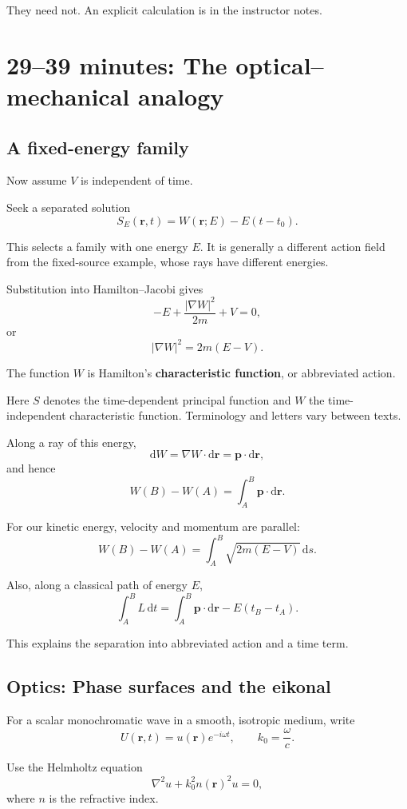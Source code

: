 \documentclass[11pt,a4paper]{article}
\newcommand{\dd}{\mathrm{d}}
\newcommand{\vr}{\mathbf{r}}
\newcommand{\vp}{\mathbf{p}}
\begin{document}
They need not.
An explicit calculation is in the instructor notes.

\section*{29--39 minutes: The optical--mechanical analogy}

\subsection*{A fixed-energy family}

Now assume \(V\) is independent of time.

Seek a separated solution
\[
\boxed{
S_E(\vr,t)
=
W(\vr;E)-E(t-t_0).
}
\]

This selects a family with one energy \(E\).
It is generally a different action field from the fixed-source
example, whose rays have different energies.

Substitution into Hamilton--Jacobi gives
\[
-E+\frac{|\nabla W|^2}{2m}+V=0,
\]
or
\[
\boxed{
|\nabla W|^2=2m(E-V).
}
\]

The function \(W\) is Hamilton's \textbf{characteristic function},
or abbreviated action.

Here \(S\) denotes the time-dependent principal function and
\(W\) the time-independent characteristic function.
Terminology and letters vary between texts.

Along a ray of this energy,
\[
\dd W
=
\nabla W\cdot\dd\vr
=
\vp\cdot\dd\vr,
\]
and hence
\[
W(B)-W(A)
=
\int_A^B\vp\cdot\dd\vr.
\]

For our kinetic energy, velocity and momentum are parallel:
\[
\boxed{
W(B)-W(A)
=
\int_A^B
\sqrt{2m(E-V)}\,\dd s.
}
\]

Also, along a classical path of energy \(E\),
\[
\int_A^B L\,\dd t
=
\int_A^B\vp\cdot\dd\vr
-
E(t_B-t_A).
\]

This explains the separation into abbreviated action
and a time term.

\subsection*{Optics: Phase surfaces and the eikonal}

For a scalar monochromatic wave in a smooth, isotropic
medium, write
\[
U(\vr,t)=u(\vr)e^{-i\omega t},
\qquad
k_0=\frac{\omega}{c}.
\]

Use the Helmholtz equation
\[
\nabla^2u+k_0^2n(\vr)^2u=0,
\]
where \(n\) is the refractive index.
\end{document}
